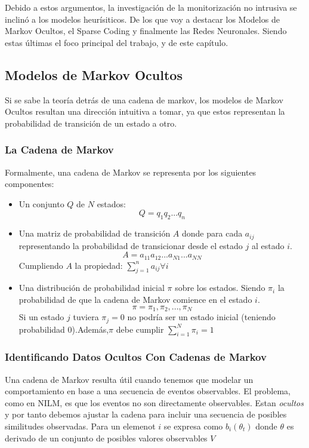 Debido a estos argumentos, la investigación de la monitorización no intrusiva se inclinó a los modelos heurísiticos. De los que voy a destacar los Modelos de Markov Ocultos, el Sparse Coding y finalmente las Redes Neuronales. Siendo estas últimas el foco principal del trabajo, y de este capítulo. 

\subsection{Modelos de Markov Ocultos}
Si se sabe la teoría detrás de una cadena de markov, los modelos de Markov Ocultos resultan una dirección intuitiva a tomar, ya que estos representan la probabilidad de transición de un estado a otro. 
\subsubsection{La Cadena de Markov}
Formalmente, una cadena de Markov se representa por los siguientes componentes:
\begin{center}
    \begin{itemize}
        \item Un conjunto $Q$ de $N$ estados: $$Q = q_1q_2...q_n$$
        \item Una matriz de probabilidad de transición $A$ donde para cada $a_{ij}$ representando la probabilidad de transicionar desde el estado $j$ al estado $i$. $$A=a_{11}a_{12}...a_{N1}...a_{NN}$$ 
        {\footnotesize Cumpliendo $A$ la propiedad: $\sum_{j=1}^n a_{ij} \forall{i}$}
        \item Una distribución de probabilidad inicial $\pi$ sobre los estados. Siendo $\pi_i$ la probabilidad de que la cadena de Markov comience en el estado $i$. $$\pi=\pi_1,\pi_2, ...,\pi_N$$ 
        {\footnotesize Si un estado $j$ tuviera $\pi_j=0$ no podría ser un estado inicial (teniendo probabilidad $0$).\linebreak Además,$\pi$ debe cumplir $\sum_{i=1}^N \pi_i = 1$}
    \end{itemize} 
    \autocite{markovStandford}
\end{center}


\subsubsection{Identificando Datos Ocultos Con Cadenas de Markov}
Una cadena de Markov resulta útil cuando tenemos que modelar un comportamiento en base a una secuencia de eventos observables. El problema, como en NILM, es que los eventos no son directamente observables. Estan \textit{ocultos} y por tanto debemos ajustar la  cadena para incluir una secuencia de posibles similitudes observadas. Para un elemenot $i$ se expresa como $b_i(\theta_t)$ donde $\theta$ es derivado de un conjunto de posibles valores observables $V$


